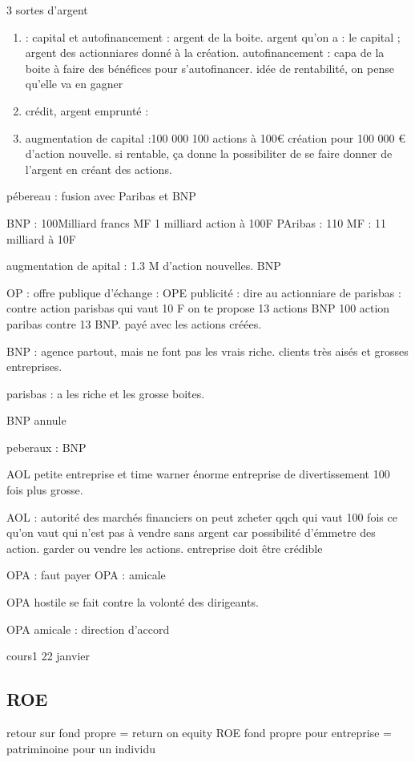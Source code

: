 \documentclass[a4paper,12pt]{article}
\begin{document}
 3 sortes d'argent



\begin{enumerate}
	\item : capital et autofinancement : argent de la boite.
	 argent qu'on a : le capital ; argent des actionniares donné à la création.
	autofinancement : capa de la boite à faire des bénéfices pour s'autofinancer.
	idée de rentabilité, on pense qu'elle va en gagner
	\item crédit, argent emprunté :
	\item augmentation de capital :100 000 100 actions à 100€
	création pour 100 000 € d'action nouvelle.
	si rentable, ça donne la possibiliter de se faire donner de l'argent en créant des actions.
\end{enumerate}

pébereau : fusion avec Paribas et BNP

BNP : 100Milliard francs MF  1 milliard action à 100F
PAribas : 110 MF   : 11 milliard à 10F


augmentation de apital : 1.3 M d'action nouvelles.
BNP  


OP : offre publique d'échange : OPE
publicité : dire au actionniare de parisbas : contre action parisbas qui vaut 10 F
on te propose 13 actions BNP 100 action paribas contre 13 BNP.
payé avec les actions créées.

BNP : agence partout, mais ne font pas les vrais riche.
clients très aisés et grosses entreprises.

parisbas : a les riche et les grosse boites.

BNP annule 

peberaux : BNP


AOL petite entreprise et time warner énorme entreprise de divertissement 100 fois plus grosse.

AOL : autorité des marchés financiers
on peut zcheter qqch qui vaut 100 fois ce qu'on vaut qui n'est pas à vendre sans argent car possibilité d'émmetre des action.
garder ou vendre les actions.
entreprise doit être crédible

OPA : faut payer
OPA : amicale 

OPA hostile se fait contre la volonté des dirigeants.

OPA amicale : direction d'accord

cours1 22 janvier 


\subsection{ROE}
retour sur fond propre = return on equity ROE
fond propre pour entreprise = patriminoine pour un individu
 
\end{document}
